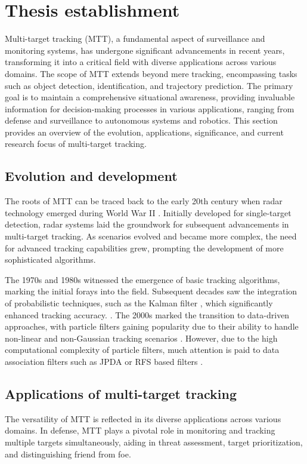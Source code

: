 \chapter{Thesis establishment}
Multi-target tracking (MTT), a fundamental aspect of surveillance and monitoring systems, has undergone significant advancements in recent years, transforming it into a critical field with diverse applications across various domains.
The scope of MTT extends beyond mere tracking, encompassing tasks such as object detection, identification, and trajectory prediction. The primary goal is to maintain a comprehensive situational awareness, providing invaluable information for decision-making processes in various applications, ranging from defense and surveillance to autonomous systems and robotics.
This section provides an overview of the evolution, applications, significance, and current research focus of multi-target tracking.
\section{Evolution and development}
The roots of MTT can be traced back to the early 20th century when radar technology emerged during World War II \cite{bar1995}. Initially developed for single-target detection, radar systems laid the groundwork for subsequent advancements in multi-target tracking. As scenarios evolved and became more complex, the need for advanced tracking capabilities grew, prompting the development of more sophisticated algorithms.

The 1970s and 1980s witnessed the emergence of basic tracking algorithms, marking the initial forays into the field. Subsequent decades saw the integration of probabilistic techniques, such as the Kalman filter \cite{kalmanFilter}, which significantly enhanced tracking accuracy. . The 2000s marked the transition to data-driven approaches, with particle filters gaining popularity due to their ability to handle non-linear and non-Gaussian tracking scenarios \cite{nonlinearParticleFilter}. However, due to the high computational complexity of particle filters, much attention is paid to data association filters such as JPDA \cite{brekke} or RFS based filters \cite{mahler}.

\section{Applications of multi-target tracking}
The versatility of MTT is reflected in its diverse applications across various domains. In defense, MTT plays a pivotal role in monitoring and tracking multiple targets simultaneously, aiding in threat assessment, target prioritization, and distinguishing friend from foe.

